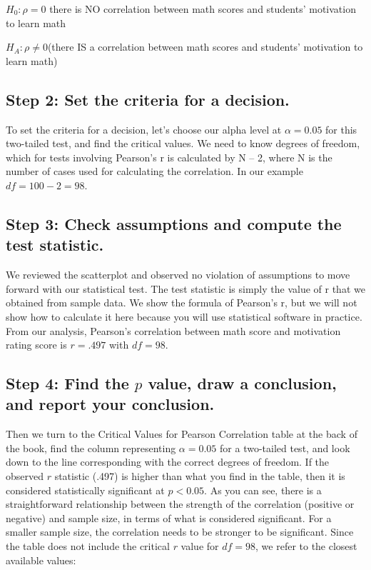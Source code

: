 \documentclass[
  letterpaper,
  DIV=11,
  numbers=noendperiod]{scrreprt}
\begin{document}
\(H_0: ρ = 0\) there is NO correlation between math scores and students'
motivation to learn math

\(H_A: ρ \ne 0\)(there IS a correlation between math scores and
students' motivation to learn math)

\subsection*{Step 2: Set the criteria for a
decision.\,}\label{step-2-set-the-criteria-for-a-decision.-6}

To set the criteria for a decision, let's choose our alpha level at
\(\alpha = 0.05\) for this two-tailed test, and find the critical
values. We need to know degrees of freedom, which for tests involving
Pearson's r is calculated by N -- 2, where N is the number of cases used
for calculating the correlation. In our example \(df = 100 - 2 = 98\).

\subsection*{Step 3: Check assumptions and compute the test
statistic.\,\,}\label{step-3-check-assumptions-and-compute-the-test-statistic.-5}

We reviewed the scatterplot and observed no violation of assumptions to
move forward with our statistical test. The test statistic is simply the
value of r that we obtained from sample data. We show the formula of
Pearson's r, but we will not show how to calculate it here because you
will use statistical software in practice. From our analysis, Pearson's
correlation between math score and motivation rating score is
\(r =.497\) with \(df = 98\).

\subsection*{\texorpdfstring{Step 4: Find the \(p\) value, draw a
conclusion, and report your
conclusion.}{Step 4: Find the p value, draw a conclusion, and report your conclusion.}}\label{step-4-find-the-p-value-draw-a-conclusion-and-report-your-conclusion.}

Then we turn to the Critical Values for Pearson Correlation table at the
back of the book, find the column representing \(\alpha = 0.05\) for a
two-tailed test, and look down to the line corresponding with the
correct degrees of freedom. If the observed \(r\) statistic (.497) is
higher than what you find in the table, then it is considered
statistically significant at \(p < 0.05\). As you can see, there is a
straightforward relationship between the strength of the correlation
(positive or negative) and sample size, in terms of what is considered
significant. For a smaller sample size, the correlation needs to be
stronger to be significant. Since the table does not include the
critical \(r\) value for \(df = 98\), we refer to the closest available
values:
\end{document}
